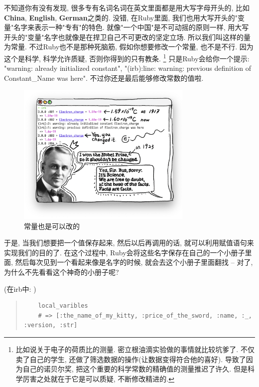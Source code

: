 不知道你有没有发现, 很多专有名词名词在英文里面都是用大写字母开头的, 比如\textbf{China}, \textbf{English}, \textbf{German}之类的. 没错, 在Ruby里面, 我们也用大写开头的"变量"名字来表示一种"专有"的特色. 就像"一个中国"是不可动摇的原则一样, 用大写开头的"变量"名字也就像是在捍卫自己不可更改的坚定立场. 所以我们叫这样的量为常量. 不过Ruby也不是那种死脑筋, 假如你想要修改一个常量, 也不是不行. 因为这个是科学, 科学允许质疑, 否则你得到的只有教条. \footnote{比如说关于电子的荷质比的测量. 密立根油滴实验做的事情就比较坑爹了. 不仅卖了自己的学生, 还做了筛选数据的操作(让数据变得符合他的喜好). 导致了因为自己的诺贝尔奖, 把这个重要的科学常数的精确值的测量推迟了许久. 但是科学厉害之处就在于它是可以质疑, 不断修改精进的. } 只是Ruby会给你一个提示: "warning: already initialized constant", "(irb):line: warning: previous definition of Constant\_Name was here". 不过你还是最后能够修改常数的值啦. 

\begin{figure}[h]
  \centering
  \includegraphics[width=0.75\textwidth]{image/chapter/1_language/constant.png}
  \caption{常量也是可以改的}
\end{figure}

于是, 当我们想要把一个值保存起来, 然后以后再调用的话, 就可以利用赋值语句来实现我们的目的了. 在这个过程中, Ruby会将这些名字保存在自己的一个小册子里面, 然后每次见到一个看起来像是名字的时候, 就会去这个小册子里面翻找 -- 对了, 为什么不先看看这个神奇的小册子呢? 

(在irb中: )

\begin{quotation}
  \begin{verbatim}
    local_varibles
    # => [:the_name_of_my_kitty, :price_of_the_sword, :name, :_, :version, :str]
  \end{verbatim}
\end{quotation}

